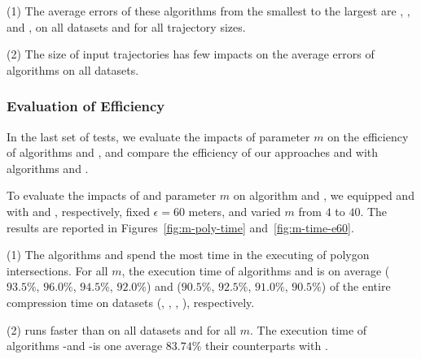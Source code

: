 \ni(1) The average errors of these algorithms from the smallest to the largest are \squishe, \dps, \cist and \cista, on all datasets and for all trajectory sizes. %

\ni(2) The size of input trajectories has few impacts on the average errors of \lsa algorithms on all datasets.





\subsubsection{Evaluation of Efficiency}

In the last set of tests, we evaluate the impacts of parameter $m$ on the efficiency of algorithms \cist and \cista, and compare the efficiency of our approaches \cist and \cista with algorithms \dps and \squishe.

%

To evaluate the impacts of \rpia and parameter $m$ on algorithm \cist and \cista, we
equipped \cist and \cista with \rpia and \cpia, respectively, fixed $\epsilon =60$ meters, and varied $m$ from $4$ to $40$.
%
The results are reported in Figures~\ref{fig:m-poly-time} and~\ref{fig:m-time-e60}.

\ni(1) The algorithms \cist and \cista spend the most time in the executing of
polygon intersections. For all $m$, the execution time of algorithms \cpia and
\rpia is on average {($93.5\%$, $96.0\%$, $94.5\%$, $92.0\%$)
	and ($90.5\%$, $92.5\%$, $91.0\%$, $90.5\%$)} of the entire compression  time on {datasets}
(\sercar, \geolife, \mopsi,  \pricar), respectively.

\ni(2) \rpia runs faster than \cpia on all datasets and for all $m$. The execution time of algorithms \cist-\rpia and \cista-\rpia is one average $83.74\%$ their counterparts with \cpia.

